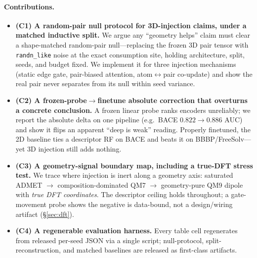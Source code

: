 \paragraph{Contributions.}
\begin{itemize}
\item \textbf{(C1) A random-pair null protocol for 3D-injection claims, under a
matched inductive split.} We argue any ``geometry helps'' claim must clear a
shape-matched random-pair null---replacing the frozen 3D pair tensor with
\texttt{randn\_like} noise at the exact consumption site, holding architecture,
split, seeds, and budget fixed. We implement it for three injection mechanisms
(static edge gate, pair-biased attention, atom$\leftrightarrow$pair co-update)
and show the real pair never separates from its null within seed variance.

\item \textbf{(C2) A frozen-probe$\rightarrow$finetune absolute correction that
overturns a concrete conclusion.} A frozen linear probe ranks encoders
unreliably; we report the absolute delta on one pipeline (e.g.\ BACE
$0.822\!\rightarrow\!0.886$ AUC) and show it flips an apparent ``deep is weak''
reading. Properly finetuned, the 2D baseline ties a descriptor RF on BACE and
beats it on BBBP/FreeSolv---yet 3D injection still adds nothing.

\item \textbf{(C3) A geometry-signal boundary map, including a true-DFT stress
test.} We trace where injection is inert along a geometry axis: saturated ADMET
$\rightarrow$ composition-dominated QM7 $\rightarrow$ geometry-pure QM9 dipole
with \emph{true DFT coordinates}. The descriptor ceiling holds throughout; a
gate-movement probe shows the negative is data-bound, not a design/wiring
artifact (\S\ref{sec:dft}).

\item \textbf{(C4) A regenerable evaluation harness.} Every table cell
regenerates from released per-seed JSON via a single script; null-protocol,
split-reconstruction, and matched baselines are released as first-class
artifacts.
\end{itemize}

